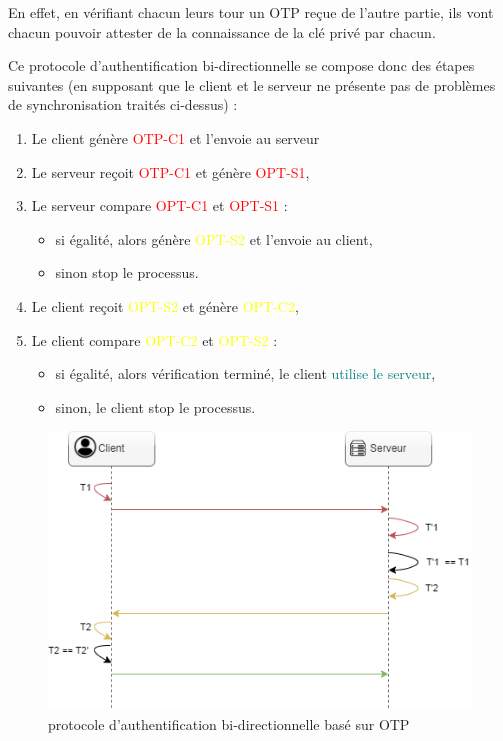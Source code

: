\documentclass[a4paper, 10pt]{article}
\newcommand{\otp}{\textsc{OTP} }
\begin{document}
En effet, en vérifiant chacun leurs tour un \otp reçue de l'autre partie, ils vont chacun pouvoir \textcolor{myblue}{attester de la connaissance
de la clé privé par chacun}.

Ce protocole d'authentification bi-directionnelle se compose donc des étapes suivantes 
(en supposant que le client et le serveur ne présente pas de problèmes de synchronisation traités ci-dessus) :
\begin{enumerate}
    \item Le client génère \textcolor{red}{OTP-C1} et l'envoie au serveur
    \item Le serveur reçoit \textcolor{red}{OTP-C1} et génère \textcolor{red}{OPT-S1},
    \item Le serveur compare \textcolor{red}{OPT-C1} et \textcolor{red}{OPT-S1} :
        \begin{itemize}
            \item si égalité, alors génère \textcolor{yellow}{OPT-S2} et l'envoie au client,
            \item sinon stop le processus.
        \end{itemize}
    \item Le client reçoit\textcolor{yellow}{ OPT-S2} et génère \textcolor{yellow}{OPT-C2},
    \item Le client compare \textcolor{yellow}{OPT-C2} et \textcolor{yellow}{OPT-S2} :
        \begin{itemize}
            \item si égalité, alors vérification terminé, le client \textcolor{teal}{utilise le serveur},
            \item sinon, le client stop le processus.\\
        \end{itemize}
\end{enumerate}

\begin{figure}[H]
        \centering
        \includegraphics[scale=0.5]{img/1/5/auth-bi-dir.drawio.png}
        \caption{protocole d'authentification bi-directionnelle basé sur \otp}
        \label{fig:hotp-resync}
\end{figure}
\end{document}
